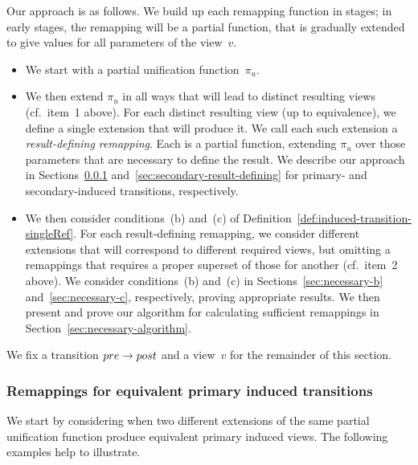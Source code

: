 Our approach is as follows.  We build up each remapping function in stages; in
early stages, the remapping will be a partial function, that is gradually
extended to give values for all parameters of the view~$v$. 
\begin{itemize}
\item We start with a partial unification function~$\pi_u$. 

\item We then extend $\pi_u$ in all ways that will lead to distinct resulting
  views (cf.~item~1 above).  For each distinct resulting view (up to
  equivalence), we define a single extension that will produce it.  We call
  each such extension a \emph{result-defining remapping}.  Each is a partial
  function, extending $\pi_u$ over those parameters that are necessary to
  define the result.  
  We describe our approach in Sections~\ref{sec:primary-result-defining}
  and~\ref{sec:secondary-result-defining} for primary- and secondary-induced
  transitions, respectively.

\item We then consider conditions~(b) and~(c) of
  Definition~\ref{def:induced-transition-singleRef}.  For each result-defining
  remapping, we consider different extensions that will correspond to
  different required views, but omitting a remappings that requires a
  proper superset of those for another (cf.~item~2 above).  
  We consider conditions~(b) and~(c) in Sections~\ref{sec:necessary-b}
  and~\ref{sec:necessary-c}, respectively, proving appropriate results.  We
  then present and prove our algorithm for calculating sufficient
  remappings in Section~\ref{sec:necessary-algorithm}.

\end{itemize}

We fix a transition $pre \stackrel{}\rightarrow post$ and a view~$v$ for the remainder of
this section. 



\subsubsection{Remappings for equivalent primary induced transitions}
\label{sec:primary-result-defining}

We start by considering when two different extensions of the same partial
unification function produce equivalent primary induced views.  The following
examples help to illustrate. 

